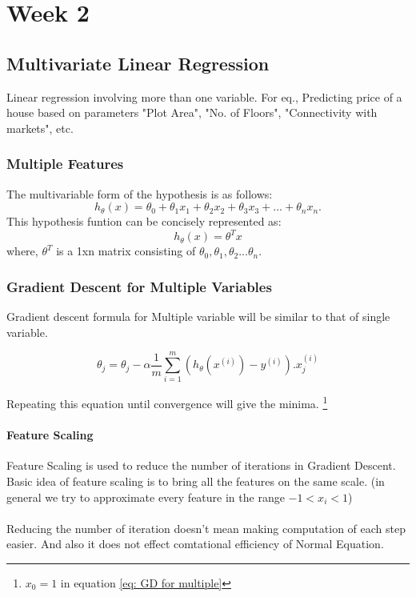 \documentclass[12pt]{report}
\begin{document}
\chapter{Week 2}

\section{Multivariate Linear Regression}
Linear regression involving more than one variable. For eq., Predicting price of a house based on parameters "Plot Area", "No. of Floors", "Connectivity with markets", etc.

\subsection{Multiple Features}
The multivariable form of the hypothesis is as follows:
\begin{equation} \label {eq:5}
	h_\theta(x) = \theta_0 + \theta_1x_1 + \theta_2x_2 + \theta_ 3x_3 + ... + \theta_{n}x_n.	
\end{equation}
This hypothesis funtion can be concisely represented as:
\begin{equation}
	h_\theta(x) = \theta^{T}x
\end{equation}
where, $ \theta^T $ is a 1xn matrix consisting of $ \theta_0, \theta_1, \theta_2 ... \theta_n $.


\subsection{Gradient Descent for Multiple Variables}
Gradient descent formula for Multiple variable will be similar to that of single variable.

\begin{equation} \label {eq: GD for multiple}
	\theta_j =  \theta_j - \alpha \frac{1}{m} \sum_{i=1}^{m} (h_\theta(x^{(i)})-y^{(i)}).x_j^{(i)}
\end{equation}

Repeating this equation until convergence will give the minima. \footnote[1]{$x_0 = 1$ in equation \ref{eq: GD for multiple}}

\subsubsection{Feature Scaling}
Feature Scaling is used to reduce the number of iterations in Gradient Descent. Basic idea of feature scaling is to bring all the features on the same scale. (in general we try to approximate every feature in the range $ -1 < x_i < 1 $)
\\ \\ Reducing the number of iteration doesn't mean making computation of each step easier. And also it does not effect comtational efficiency of Normal Equation.
\end{document}
